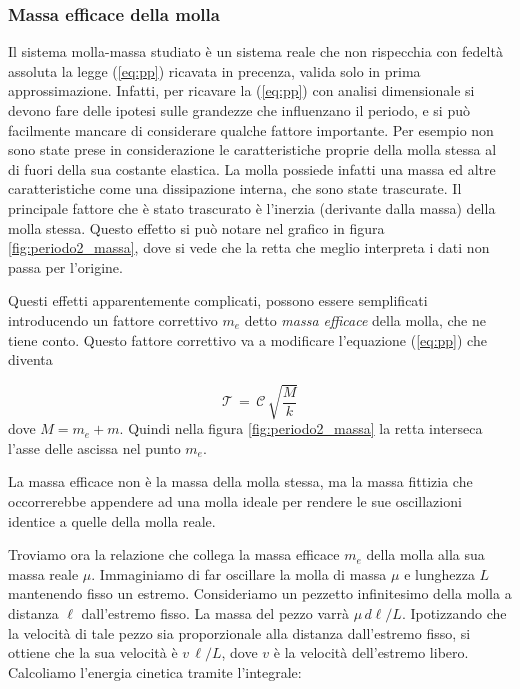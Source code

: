 \subsubsection{Massa efficace della molla}

Il sistema molla-massa studiato è un sistema reale che non rispecchia con fedeltà assoluta la legge (\ref{eq:pp}) ricavata in precenza, valida solo in prima approssimazione. Infatti, per ricavare la (\ref{eq:pp}) con analisi dimensionale
si devono fare delle ipotesi sulle grandezze che influenzano il periodo, e si può facilmente mancare di considerare qualche
fattore importante. Per esempio non sono state prese in considerazione le caratteristiche proprie della molla stessa
al di fuori della sua costante elastica. La molla possiede infatti una massa ed altre caratteristiche
come una dissipazione interna, che sono state trascurate. Il principale fattore che è stato trascurato
è l'inerzia (derivante dalla massa) della molla stessa. Questo effetto si può notare nel grafico in figura \ref{fig:periodo2_massa},
dove si vede che la retta che meglio interpreta i dati non passa per l'origine.

Questi effetti apparentemente complicati, possono essere semplificati introducendo un fattore correttivo $m_e$ detto
\emph{massa efficace} della molla, che ne tiene conto. Questo fattore correttivo va a modificare l'equazione (\ref{eq:pp}) che diventa

\begin{equation}
    \mathcal{T} \, = \, \mathcal{C} \, \sqrt{\frac{M}{k}}
    \label{eq:ppme}
\end{equation}
%
dove $M = m_e + m$. Quindi nella figura \ref{fig:periodo2_massa} la retta interseca l'asse delle ascissa
nel punto $m_e$.

La massa efficace non è la massa della molla stessa, ma la massa fittizia che occorrerebbe
appendere ad una molla ideale per rendere le sue oscillazioni identice a quelle della molla reale.

Troviamo ora la relazione che collega la massa efficace $m_e$ della molla alla sua massa reale $\mu$.
Immaginiamo di far oscillare la molla di massa $\mu$ e lunghezza $L$ mantenendo fisso un estremo.
Consideriamo un pezzetto infinitesimo della molla a distanza $\ell$ dall'estremo fisso. La massa del pezzo
varrà $\mu \, d\ell / L$. Ipotizzando che la velocità di tale pezzo sia proporzionale alla distanza dall'estremo
fisso, si ottiene che la sua velocità è $v \, \ell / L$, dove $v$ è la velocità dell'estremo libero.
Calcoliamo l'energia cinetica tramite l'integrale:

